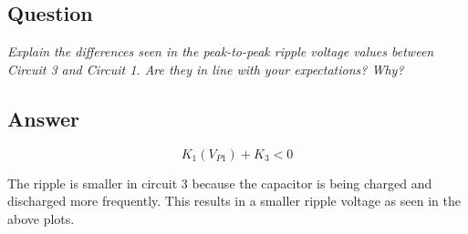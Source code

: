 \documentclass[a4paper,12pt]{article}
\begin{document}
	\subsection*{Question}	
	\textit{Explain the differences seen in the peak-to-peak ripple voltage values between Circuit 3 and Circuit 1. Are they in line with your expectations? Why?}
	
	\subsection*{Answer}
	\begin{equation}
	K_1(V_{P1})+K_3 < 0
	\end{equation}
	
	The ripple is smaller in circuit 3 because the capacitor is being charged and discharged more frequently. This results in a smaller ripple voltage as seen in the above plots.
\end{document}
